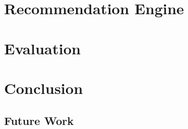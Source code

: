 \documentclass[12pt]{elsarticle}
\begin{document}
\section{Recommendation Engine}


\section{Evaluation}


\section{Conclusion}
\subsection{Future Work}




\newpage
\appendix
\end{document}
